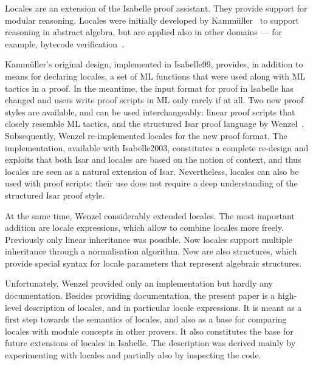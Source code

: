 %
\begin{isabellebody}%
\def\isabellecontext{Locales}%
\isanewline
\isamarkupfalse%
\isamarkupfalse%
%
\isamarkuptrue%
%
\begin{isamarkuptext}%
Locales are an extension of the Isabelle proof assistant.  They
  provide support for modular reasoning. Locales were initially
  developed by Kamm\"uller~\cite{Kammuller2000} to support reasoning
  in abstract algebra, but are applied also in other domains --- for
  example, bytecode verification~\cite{Klein2003}.

  Kamm\"uller's original design, implemented in Isabelle99, provides, in
  addition to
  means for declaring locales, a set of ML functions that were used
  along with ML tactics in a proof.  In the meantime, the input format
  for proof in Isabelle has changed and users write proof
  scripts in ML only rarely if at all.  Two new proof styles are
  available, and can
  be used interchangeably: linear proof scripts that closely resemble ML
  tactics, and the structured Isar proof language by
  Wenzel~\cite{Wenzel2002a}.  Subsequently, Wenzel re-implemented
  locales for
  the new proof format.  The implementation, available with
  Isabelle2003, constitutes a complete re-design and exploits that
  both Isar and locales are based on the notion of context,
  and thus locales are seen as a natural extension of Isar.
  Nevertheless, locales can also be used with proof scripts:
  their use does not require a deep understanding of the structured
  Isar proof style.

  At the same time, Wenzel considerably extended locales.  The most
  important addition are locale expressions, which allow to combine
  locales more freely.  Previously only
  linear inheritance was possible.  Now locales support multiple
  inheritance through a normalisation algorithm.  New are also
  structures, which provide special syntax for locale parameters that
  represent algebraic structures.

  Unfortunately, Wenzel provided only an implementation but hardly any
  documentation.  Besides providing documentation, the present paper
  is a high-level description of locales, and in particular locale
  expressions.  It is meant as a first step towards the semantics of
  locales, and also as a base for comparing locales with module concepts
  in other provers.  It also constitutes the base for future
  extensions of locales in Isabelle.
  The description was derived mainly by experimenting
  with locales and partially also by inspecting the code.


\end{isamarkuptext}
\end{isabellebody}
